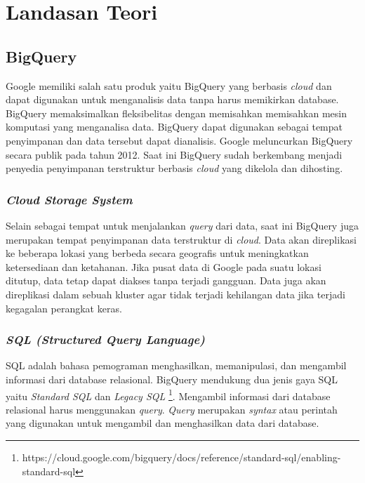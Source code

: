 \chapter{Landasan Teori}
\label{chap:teori}

\section{BigQuery\cite{bqa, bqIntroduction}}
Google memiliki salah satu produk yaitu BigQuery yang berbasis \textit{cloud} dan dapat digunakan untuk menganalisis data tanpa harus memikirkan database. BigQuery memaksimalkan fleksibelitas dengan memisahkan memisahkan mesin komputasi yang menganalisa data. BigQuery dapat digunakan sebagai tempat penyimpanan dan data tersebut dapat dianalisis. Google meluncurkan BigQuery secara publik pada tahun 2012. Saat ini BigQuery sudah berkembang menjadi penyedia penyimpanan terstruktur berbasis \textit{cloud} yang dikelola dan dihosting. 

\subsection{\textit{Cloud Storage System}}
Selain sebagai tempat untuk menjalankan \textit{query} dari data, saat ini BigQuery juga merupakan tempat penyimpanan data terstruktur di \textit{cloud}. Data akan direplikasi ke beberapa lokasi yang berbeda secara geografis untuk meningkatkan ketersediaan dan ketahanan. Jika pusat data di Google pada suatu lokasi ditutup, data tetap dapat diakses tanpa terjadi gangguan. Data juga akan direplikasi dalam sebuah kluster agar tidak terjadi kehilangan data jika terjadi kegagalan perangkat keras. 

\subsection{\textit{SQL (Structured Query Language) \cite{book:22611}}}
SQL adalah bahasa pemograman menghasilkan, memanipulasi, dan mengambil informasi dari database relasional. BigQuery mendukung dua jenis gaya SQL yaitu \textit{Standard SQL} dan \textit{Legacy SQL} \footnote{https://cloud.google.com/bigquery/docs/reference/standard-sql/enabling-standard-sql}. Mengambil informasi dari database relasional harus menggunakan \textit{query}. \textit{Query} merupakan \textit{syntax} atau perintah yang digunakan untuk mengambil dan menghasilkan data dari database.

